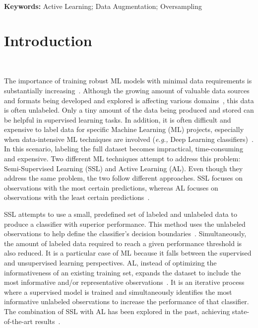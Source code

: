 \vspace{.5cm}
\textbf{Keywords:} Active Learning; Data Augmentation; Oversampling


\section{Introduction}~\label{sec:introduction-al-aug}

The importance of training robust ML models with minimal data
requirements is substantially increasing~\cite{Nath2021, Sverchkov2017,
Li2012}. Although the growing amount of valuable data sources and formats
being developed and explored is affecting various domains~\cite{Li2021}, this
data is often unlabeled. Only a tiny amount of the data being produced and
stored can be helpful in supervised learning tasks. In addition, it is often
difficult and expensive to label data for specific Machine Learning (ML)
projects, especially when data-intensive ML techniques are involved
(\textit{e.g.,} Deep Learning classifiers)~\cite{Nath2021}. In this scenario,
labeling the full dataset becomes impractical, time-consuming and expensive.
Two different ML techniques attempt to address this problem: Semi-Supervised
Learning (SSL) and Active Learning (AL). Even though they address the same
problem, the two follow different approaches. SSL focuses on observations with
the most certain predictions, whereas AL focuses on observations with the
least certain predictions~\cite{Simeoni2020}.

SSL attempts to use a small, predefined set of labeled and unlabeled data to
produce a classifier with superior performance. This method uses the unlabeled
observations to help define the classifier's decision
boundaries~\cite{Van2020}. Simultaneously, the amount of labeled data required
to reach a given performance threshold is also reduced. It is a particular
case of ML because it falls between the supervised and unsupervised learning
perspectives. AL, instead of optimizing the informativeness of an existing
training set, expands the dataset to include the most informative and/or
representative observations~\cite{Sener2018}. It is an iterative process where
a supervised model is trained and simultaneously identifies the most
informative unlabeled observations to increase the performance of that
classifier. The combination of SSL with AL has been explored in the past,
achieving state-of-the-art results~\cite{Leng2013}.
 

